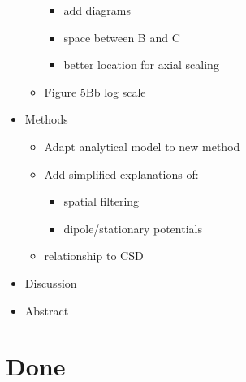 \documentclass[]{article}
\providecommand{\tightlist}{%
  \setlength{\itemsep}{0pt}\setlength{\parskip}{0pt}}
\begin{document}
\begin{itemize}
\begin{itemize}
    \begin{itemize}
    \tightlist
    \item
      add diagrams
    \item
      space between B and C
    \item
      better location for axial scaling
    \end{itemize}
  \item
    Figure 5Bb log scale
  \end{itemize}
\item
  Methods

  \begin{itemize}
  \tightlist
  \item
    Adapt analytical model to new method
  \item
    Add simplified explanations of:

    \begin{itemize}
    \tightlist
    \item
      spatial filtering
    \item
      dipole/stationary potentials
    \end{itemize}
  \item
    relationship to CSD
  \end{itemize}
\item
  Discussion
\item
  Abstract
\end{itemize}

\section{Done}\label{done}
\end{document}
